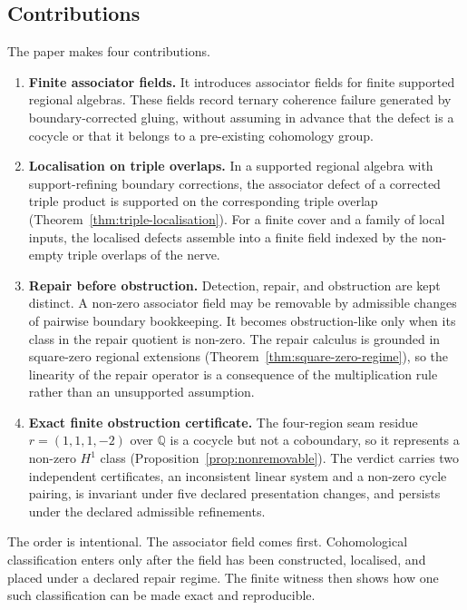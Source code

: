 \documentclass[11pt]{article}
\newcommand{\Q}{\mathbb{Q}}
\begin{document}
\subsection{Contributions}
\label{sec:contributions}

The paper makes four contributions.

\begin{enumerate}[label=(\arabic*)]
\item \textbf{Finite associator fields.} It introduces associator fields for finite supported regional algebras. These fields record ternary coherence failure generated by boundary-corrected gluing, without assuming in advance that the defect is a cocycle or that it belongs to a pre-existing cohomology group.

\item \textbf{Localisation on triple overlaps.} In a supported regional algebra with support-refining boundary corrections, the associator defect of a corrected triple product is supported on the corresponding triple overlap (Theorem~\ref{thm:triple-localisation}). For a finite cover and a family of local inputs, the localised defects assemble into a finite field indexed by the non-empty triple overlaps of the nerve.

\item \textbf{Repair before obstruction.} Detection, repair, and obstruction are kept distinct. A non-zero associator field may be removable by admissible changes of pairwise boundary bookkeeping. It becomes obstruction-like only when its class in the repair quotient is non-zero. The repair calculus is grounded in square-zero regional extensions (Theorem~\ref{thm:square-zero-regime}), so the linearity of the repair operator is a consequence of the multiplication rule rather than an unsupported assumption.

\item \textbf{Exact finite obstruction certificate.} The four-region seam residue \(r=(1,1,1,-2)\) over \(\Q\) is a cocycle but not a coboundary, so it represents a non-zero \(H^1\) class (Proposition~\ref{prop:nonremovable}). The verdict carries two independent certificates, an inconsistent linear system and a non-zero cycle pairing, is invariant under five declared presentation changes, and persists under the declared admissible refinements.
\end{enumerate}

The order is intentional. The associator field comes first. Cohomological classification enters only after the field has been constructed, localised, and placed under a declared repair regime. The finite witness then shows how one such classification can be made exact and reproducible.
\end{document}
